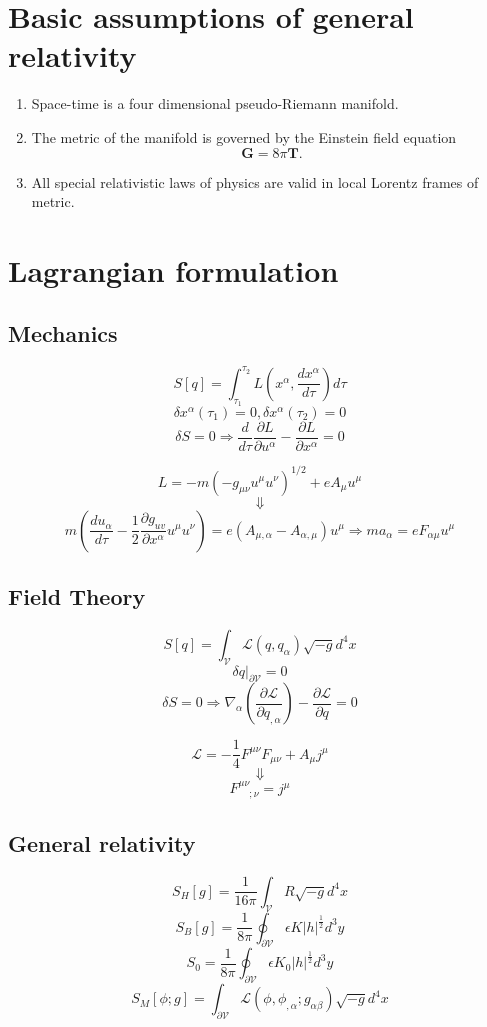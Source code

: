 \section{Basic assumptions of general relativity}
\begin{enumerate}
\item Space-time is a four dimensional pseudo-Riemann manifold.
\item The metric of the manifold is governed by the Einstein field equation
\[\bm{G} = 8\pi\bm{T}.\]
\item  All special relativistic laws of physics are valid in local Lorentz frames of metric.
\end{enumerate}

\section{Lagrangian formulation}
\subsection{Mechanics}
\[S[q] = \int_{\tau_1}^{\tau_2} L(x^{\alpha},\frac{dx^{\alpha}}{d\tau}) d\tau\]
\[\delta x^{\alpha}(\tau_1)=0, \delta x^{\alpha}(\tau_2)=0\]
\[\delta S = 0 \Rightarrow \frac{d}{d\tau} \frac{\partial L}{\partial u^{\alpha}} - \frac{\partial L}{\partial x^{\alpha}}=0\]
\begin{example}
\[L = -m(-g_{\mu\nu} u^{\mu} u^{\nu})^{1/2} + e A_{\mu} u^{\mu}\]
\[\Downarrow\]
\[m(\frac{du_{\alpha}}{d\tau} - \frac{1}{2} \frac{\partial g_{uv}}{\partial x^{\alpha}} u^{\mu} u^{\nu}) = e(A_{\mu,\alpha}-A_{\alpha,\mu})u^{\mu} \Rightarrow ma_{\alpha} = eF_{\alpha\mu} u^{\mu} \]
\end{example}

\subsection{Field Theory}
\[S[q] = \int_{\mathcal{V}} \mathcal{L}(q,q_{\alpha})\sqrt{-g} d^4x\]
\[\delta q|_{\partial \mathcal{V}} = 0\]
\[\delta S = 0 \Rightarrow \nabla_{\alpha} (\frac{\partial \mathcal{L}}{\partial q_{,\alpha}}) - \frac{\partial \mathcal{L}}{\partial q} = 0\]
\begin{example}
\[\mathcal{L} = -\frac{1}{4} F^{\mu \nu} F_{\mu \nu} + A_{\mu} j^{\mu}\]
\[\Downarrow\]
\[F^{\mu \nu}_{\phantom{\mu \nu} ;\nu} = j^{\mu}\]
\end{example}

\subsection{General relativity}
\[S_{H}[g] = \frac{1}{16\pi} \int_{\mathcal{V}} R \sqrt{-g} d^4 x\]
\[S_{B}[g] = \frac{1}{8 \pi} \oint_{\partial \mathcal{V}} \epsilon K |h|^{\frac{1}{2}} d^3 y\]
\[S_0 = \frac{1}{8\pi} \oint_{\partial \mathcal{V}} \epsilon K_0 |h|^{\frac{1}{2}} d^3 y\]
\[S_M[\phi;g] = \int_{\partial \mathcal{V}} \mathcal{L}(\phi,\phi_{,\alpha};g_{\alpha \beta}) \sqrt{-g} d^4 x\]
